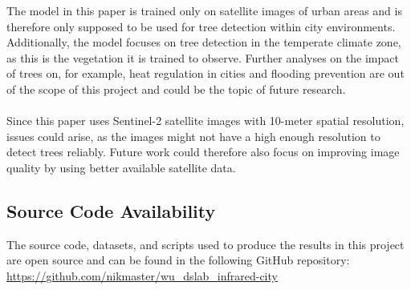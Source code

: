 The model in this paper is trained only on satellite images of urban areas and is therefore only supposed to be used for tree detection within city environments. Additionally, the model focuses on tree detection in the temperate climate zone, as this is the vegetation it is trained to observe. Further analyses on the impact of trees on, for example, heat regulation in cities and flooding prevention are out of the scope of this project and could be the topic of future research. \\
\\
Since this paper uses Sentinel-2 satellite images with 10-meter spatial resolution, issues could arise, as the images might not have a high enough resolution to detect trees reliably. Future work could therefore also focus on improving image quality by using better available satellite data.

\subsection{Source Code Availability}
The source code, datasets, and scripts used to produce the results in this project are open source and can be found in the following GitHub repository: \\
\url{https://github.com/nikmaster/wu_dslab_infrared-city}
